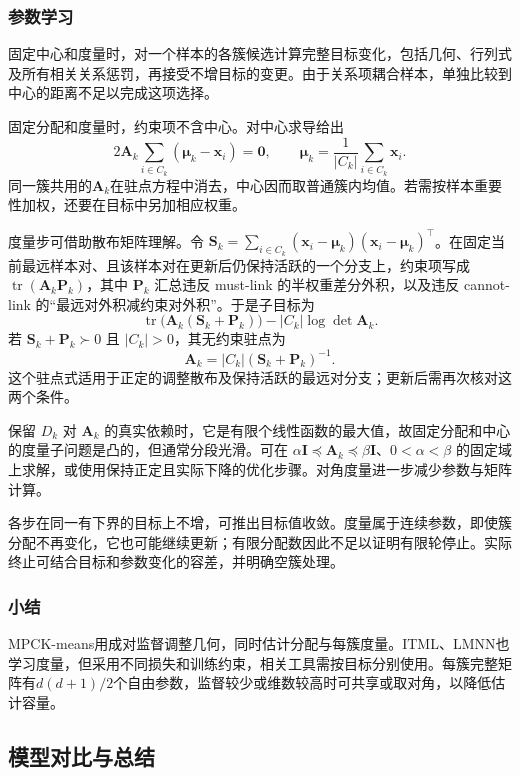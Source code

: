 \subsubsection{参数学习}

固定中心和度量时，对一个样本的各簇候选计算完整目标变化，包括几何、行列式及所有相关关系惩罚，再接受不增目标的变更。由于关系项耦合样本，单独比较到中心的距离不足以完成这项选择。

固定分配和度量时，约束项不含中心。对中心求导给出
\[
 2\bm{A}_k\sum_{i\in C_k}(\bm{\mu}_k-\bm{x}_i)=\bm{0},
 \qquad
 \bm{\mu}_k=\frac{1}{|C_k|}\sum_{i\in C_k}\bm{x}_i.
\]
同一簇共用的$\bm{A}_k$在驻点方程中消去，中心因而取普通簇内均值。若需按样本重要性加权，还要在目标中另加相应权重。

度量步可借助散布矩阵理解。令 $\bm{S}_k=\sum_{i\in C_k}(\bm{x}_i-\bm{\mu}_k)(\bm{x}_i-\bm{\mu}_k)^\top$。在固定当前最远样本对、且该样本对在更新后仍保持活跃的一个分支上，约束项写成 $\operatorname{tr}(\bm{A}_k\bm{P}_k)$，其中 $\bm{P}_k$ 汇总违反 must-link 的半权重差分外积，以及违反 cannot-link 的“最远对外积减约束对外积”。于是子目标为
\[
 \operatorname{tr}\bigl(\bm{A}_k(\bm{S}_k+\bm{P}_k)\bigr)
 -|C_k|\log\det\bm{A}_k.
\]
若 $\bm{S}_k+\bm{P}_k\succ0$ 且 $|C_k|>0$，其无约束驻点为
\begin{equation}
 \bm{A}_k=|C_k|(\bm{S}_k+\bm{P}_k)^{-1}.
 \label{eq:clustering-mpck-metric}
\end{equation}
这个驻点式适用于正定的调整散布及保持活跃的最远对分支；更新后需再次核对这两个条件。

保留 $D_k$ 对 $\bm{A}_k$ 的真实依赖时，它是有限个线性函数的最大值，故固定分配和中心的度量子问题是凸的，但通常分段光滑。可在 $\alpha\bm{I}\preceq\bm{A}_k\preceq\beta\bm{I}$、$0<\alpha<\beta$ 的固定域上求解，或使用保持正定且实际下降的优化步骤。对角度量进一步减少参数与矩阵计算。

各步在同一有下界的目标上不增，可推出目标值收敛。度量属于连续参数，即使簇分配不再变化，它也可能继续更新；有限分配数因此不足以证明有限轮停止。实际终止可结合目标和参数变化的容差，并明确空簇处理。

\subsubsection{小结}

MPCK-means用成对监督调整几何，同时估计分配与每簇度量。ITML、LMNN也学习度量，但采用不同损失和训练约束，相关工具需按目标分别使用。每簇完整矩阵有$d(d+1)/2$个自由参数，监督较少或维数较高时可共享或取对角，以降低估计容量。

\subsection{模型对比与总结}

